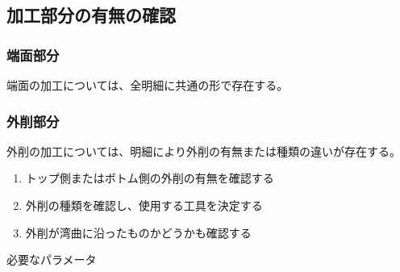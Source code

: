 \subsection{加工部分の有無の確認}

\subsubsection{端面部分}
端面の加工については、全明細に共通の形で存在する。

\subsubsection{外削部分}
外削の加工については、明細により外削の有無または種類の違いが存在する。
\begin{enumerate}
\item トップ側またはボトム側の外削の有無を確認する
\item 外削の種類を確認し、使用する工具を決定する
\item {}外削が湾曲に沿ったものかどうかも確認する
\end{enumerate}
\begin{Parameter}{必要なパラメータ}
\PMTopOutcutExists%
\PMBottomOutcutExists%
\PMTopOutcutType%
\PMBottomOutcutShape%
\end{Parameter}

